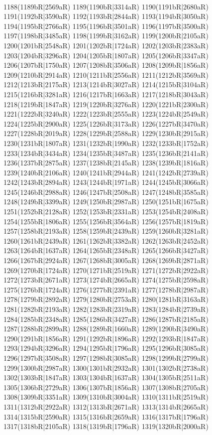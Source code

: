 \\1188(1189bR|2569aR) 1189(1190bR|3314aR) 1190(1191bR|2680aR) 1191(1192bR|3590aR) 1192(1193bR|2844aR) 1193(1194bR|3050aR) 1194(1195bR|2766aR) 1195(1196bR|3501aR) 1196(1197bR|3500aR) \\1197(1198bR|3485aR) 1198(1199bR|3162aR) 1199(1200bR|2105aR) 1200(1201bR|2548aR) 1201(1202bR|1724aR) 1202(1203bR|2383aR) 1203(1204bR|3296aR) 1204(1205bR|1807aR) 1205(1206bR|3347aR) \\1206(1207bR|1750aR) 1207(1208bR|3506aR) 1208(1209bR|1856aR) 1209(1210bR|2914aR) 1210(1211bR|2556aR) 1211(1212bR|3569aR) 1212(1213bR|2175aR) 1213(1214bR|3027aR) 1214(1215bR|3104aR) \\1215(1216bR|3281aR) 1216(1217bR|1663aR) 1217(1218bR|3043aR) 1218(1219bR|1847aR) 1219(1220bR|3276aR) 1220(1221bR|2300aR) 1221(1222bR|3240aR) 1222(1223bR|2555aR) 1223(1224bR|2549aR) \\1224(1225bR|2900aR) 1225(1226bR|3173aR) 1226(1227bR|3470aR) 1227(1228bR|2019aR) 1228(1229bR|2588aR) 1229(1230bR|2915aR) 1230(1231bR|1807aR) 1231(1232bR|1990aR) 1232(1233bR|1752aR) \\1233(1234bR|3434aR) 1234(1235bR|3487aR) 1235(1236bR|2141aR) 1236(1237bR|2875aR) 1237(1238bR|2145aR) 1238(1239bR|1816aR) 1239(1240bR|2106aR) 1240(1241bR|2944aR) 1241(1242bR|2739aR) \\1242(1243bR|2894aR) 1243(1244bR|1971aR) 1244(1245bR|3066aR) 1245(1246bR|2988aR) 1246(1247bR|2508aR) 1247(1248bR|3585aR) 1248(1249bR|3399aR) 1249(1250bR|2987aR) 1250(1251bR|1675aR) \\1251(1252bR|2128aR) 1252(1253bR|2331aR) 1253(1254bR|2408aR) 1254(1255bR|1806aR) 1255(1256bR|3564aR) 1256(1257bR|1819aR) 1257(1258bR|2193aR) 1258(1259bR|2439aR) 1259(1260bR|3281aR) \\1260(1261bR|2439aR) 1261(1262bR|3382aR) 1262(1263bR|2452aR) 1263(1264bR|1637aR) 1264(1265bR|2348aR) 1265(1266bR|3427aR) 1266(1267bR|2924aR) 1267(1268bR|3005aR) 1268(1269bR|2871aR) \\1269(1270bR|1724aR) 1270(1271bR|2519aR) 1271(1272bR|2922aR) 1272(1273bR|2671aR) 1273(1274bR|2665aR) 1274(1275bR|2598aR) 1275(1276bR|1724aR) 1276(1277bR|2391aR) 1277(1278bR|2987aR) \\1278(1279bR|2892aR) 1279(1280bR|2753aR) 1280(1281bR|3163aR) 1281(1282bR|2193aR) 1282(1283bR|2319aR) 1283(1284bR|2739aR) 1284(1285bR|2348aR) 1285(1286bR|3427aR) 1286(1287bR|2185aR) \\1287(1288bR|2899aR) 1288(1289bR|1660aR) 1289(1290bR|3490aR) 1290(1291bR|1856aR) 1291(1292bR|1896aR) 1292(1293bR|1847aR) 1293(1294bR|3296aR) 1294(1295bR|1796aR) 1295(1296bR|3085aR) \\1296(1297bR|3508aR) 1297(1298bR|3085aR) 1298(1299bR|2799aR) 1299(1300bR|2987aR) 1300(1301bR|2932aR) 1301(1302bR|2738aR) 1302(1303bR|1847aR) 1303(1304bR|1637aR) 1304(1305bR|2511aR) \\1305(1306bR|2729aR) 1306(1307bR|1856aR) 1307(1308bR|2705aR) 1308(1309bR|3351aR) 1309(1310bR|3004aR) 1310(1311bR|2519aR) 1311(1312bR|2922aR) 1312(1313bR|2671aR) 1313(1314bR|2665aR) \\1314(1315bR|2590aR) 1315(1316bR|2659aR) 1316(1317bR|1796aR) 1317(1318bR|2105aR) 1318(1319bR|1796aR) 1319(1320bR|2000aR) 